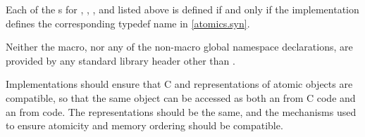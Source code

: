 \pnum
Each of the s for
, , , and 
listed above is defined if and only if the implementation defines
the corresponding typedef name in \ref{atomics.syn}.

\pnum
Neither the  macro,
nor any of the non-macro global namespace declarations,
are provided by any \Cpp{} standard library header
other than .

\pnum
\recommended
Implementations should ensure
that C and \Cpp{} representations of atomic objects are compatible,
so that the same object can be accessed as both an 
from C code and an  from \Cpp{} code.
The representations should be the same, and
the mechanisms used to ensure atomicity and memory ordering
should be compatible.
